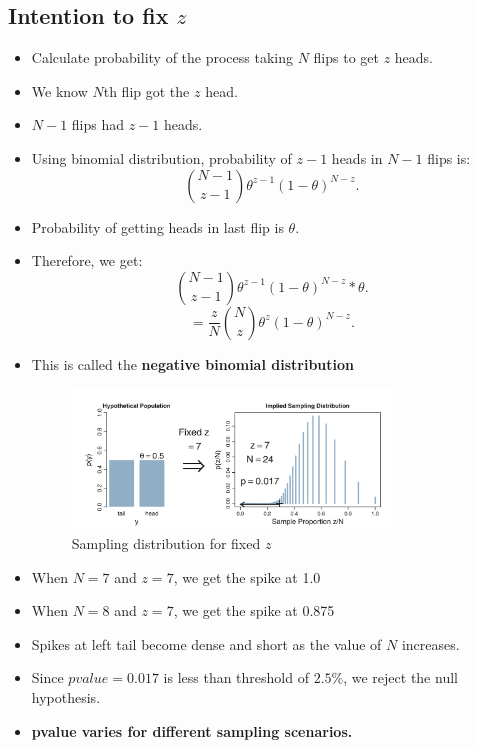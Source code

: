 \documentclass[a4paper]{article}
\begin{document}
\subsection{Intention to fix $z$ }
\begin{itemize}
    \item Calculate probability of the process taking $N$ flips to get $z$ heads. 
    \item We know $ N$th flip got the $z$ head.
    \item $N-1$ flips had $z-1$ heads.
    \item Using binomial distribution, probability of $z-1$ heads in $N-1$ flips is:
        \[
            \binom{N-1}{z-1}\theta^{z-1}(1-\theta)^{N-z}
        .\] 
    \item Probability of getting heads in last flip is $\theta$.
    \item Therefore, we get:
        \[
            \binom{N-1}{z-1}\theta^{z-1}(1-\theta)^{N-z}* \theta
        .\]         
        \[
            =     \frac{z}{N} \binom{N}{z}\theta^{z}(1-\theta)^{N-z}
        .\] 
    \item This is called the \textbf{negative binomial distribution}  
        \begin{figure}[H]
            \centering
            \includegraphics[width=0.8\textwidth]{nbd_distribution}
            \caption{Sampling distribution for fixed $z$}
            \label{fig:nbd_distribution}
        \end{figure}
    \item When $N=7$ and $z=7$, we get the spike at 1.0
    \item When $N=8$ and $z=7$, we get the spike at 0.875
    \item Spikes at left tail become dense and short as the value of $N$ increases.
    \item Since $pvalue=0.017$ is less than threshold of $2.5\%$, we reject the null hypothesis.
    \item \textbf{pvalue varies for different sampling scenarios.}
\end{itemize}
\end{document}
